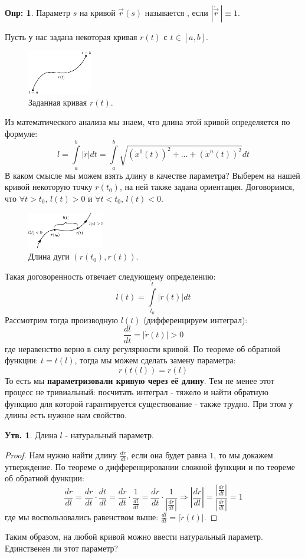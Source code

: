 \documentclass[12pt]{article}
\theoremstyle{definition}
\newtheorem{defn}{Опр:}
\newtheorem{prop}{Утв.}
\newcommand{\ddint}[2]{\displaystyle\int\limits_{#1}^{#2}}
\begin{document}
\begin{defn}
	Параметр $s$ на кривой $\vec{r}(s)$ называется , если $|\dot{\vec{r}} \, | \equiv 1$.
\end{defn}
Пусть у нас задана некоторая кривая $r(t)$ с $t \in [a,b]$.
\begin{figure}[H]
	\centering
	\includegraphics[width=0.25\textwidth]{CDGL1_9.eps}
	\caption{Заданная кривая $r(t)$.}
	\label{1_9}
\end{figure}
Из математического анализа мы знаем, что длина этой кривой определяется по формуле:
$$
	l = \ddint{a}{b}|\dot{r}|dt = \ddint{a}{b}\sqrt{(\dot{x}^1(t))^2 + \dotsc + (\dot{x}^n(t))^2}dt
$$
В каком смысле мы можем взять длину в качестве параметра? Выберем на нашей кривой некоторую точку $r(t_0)$, на ней также задана ориентация. Договоримся, что $\forall t > t_0, \, l(t) > 0$ и $\forall t < t_0, \, l(t) < 0$.
\begin{figure}[H]
	\centering
	\includegraphics[width=0.3\textwidth]{CDGL1_10.eps}
	\caption{Длина дуги $(r(t_0), r(t))$.}
	\label{1_10}
\end{figure}
Такая договоренность отвечает следующему определению:
$$
	l(t) = \ddint{t_0}{t}|\dot{r}(t)|dt
$$
Рассмотрим тогда производную $l(t)$ (дифференцируем интеграл):
$$
	\dfrac{dl}{dt} = |\dot{r}(t)| > 0
$$
где неравенство верно в силу регулярности кривой. По теореме об обратной функции: $t = t(l)$, тогда мы можем сделать замену параметра:
$$
	r(t(l)) = r(l)
$$
То есть мы \textbf{параметризовали кривую через её длину}. Тем не менее этот процесс не тривиальный: посчитать интеграл - тяжело и найти обратную функцию для которой гарантируется существование - также трудно.
При этом у длины есть нужное нам свойство.

\begin{prop}
	Длина $l$ - натуральный параметр.
\end{prop}
\begin{proof}
	Нам нужно найти длину $\tfrac{dr}{dl}$, если она будет равна $1$, то мы докажем утверждение. По теореме о дифференцировании сложной функции и по теореме об обратной функции:
	$$
		\dfrac{dr}{dl} = \dfrac{dr}{dt}{\cdot}\dfrac{dt}{dl} = \dfrac{dr}{dt}{\cdot}\dfrac{1}{\tfrac{dl}{dt}} = \dfrac{dr}{dt}{\cdot}\dfrac{1}{\left|\tfrac{dr}{dt}\right|} \Rightarrow \left|\dfrac{dr}{dl}\right| = \dfrac{\left|\tfrac{dr}{dt}\right|}{\left|\tfrac{dr}{dt}\right|} = 1
	$$
	где мы воспользовались равенством выше: $\tfrac{dl}{dt} = |\dot{r}(t)|$.
\end{proof}
Таким образом, на любой кривой можно ввести натуральный параметр. Единственен ли этот параметр?
\end{document}

